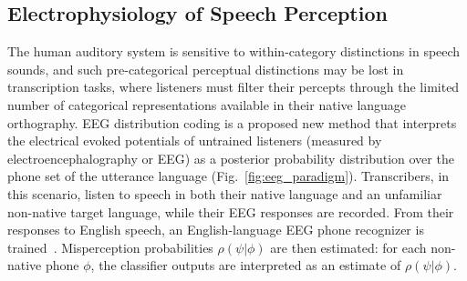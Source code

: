 \subsection{Electrophysiology of Speech Perception}

The human auditory system is sensitive to within-category distinctions
in speech sounds, and such pre-categorical perceptual distinctions may
be lost in transcription tasks, where listeners must filter their
percepts through the limited number of categorical representations
available in their native language orthography.  EEG distribution
coding is a proposed new method that interprets the electrical evoked
potentials of untrained listeners (measured by
electroencephalography or EEG) as a posterior probability distribution
over the phone set of the utterance language
(Fig.~\ref{fig:eeg_paradigm}).  Transcribers, in this scenario, listen
to speech in both their native language and an unfamiliar non-native
target language, while their EEG responses are recorded.  From their
responses to English speech, an English-language EEG phone recognizer
is trained~\cite{Liberto15}.  Misperception probabilities
$\rho(\psi|\phi)$ are then estimated: for each non-native phone
$\phi$, the classifier outputs are interpreted as an estimate of
$\rho(\psi|\phi)$.

